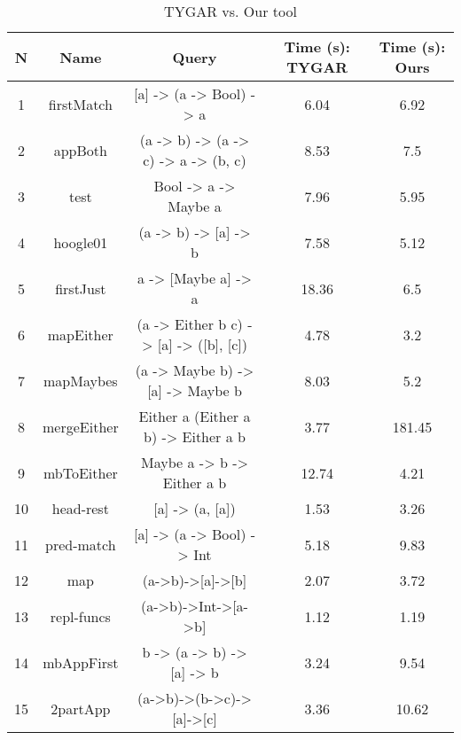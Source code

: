 \documentclass[acmsmall,nonacm]{acmart}
\begin{document}
\begin{table*}
  \tiny
  \caption{TYGAR vs. Our tool }
  \label{tab:results}
  \begin{tabular}{c c c | c | c }
    \toprule
    N & Name & Query   &  Time (s): TYGAR	& Time (s): Ours	\\ %
    \midrule
    1 & firstMatch	&	[a] -> (a -> Bool) -> a	&	6.04&		6.92\\ %
    2 &	appBoth &	(a -> b) -> (a -> c) -> a -> (b, c)	&	8.53	&	7.5\\ %
    3 &	test	&	Bool -> a -> Maybe a	&	7.96&		5.95	\\ %
    4 & hoogle01	&	(a -> b) -> [a] -> b	&	7.58&		5.12	\\ %
    5 &	firstJust	&	a -> [Maybe a] -> a	&	18.36	&	6.5	\\ %
    6 &	mapEither	&	(a -> Either b c) -> [a] -> ([b], [c])&		4.78&		3.2	\\ %
    7 &	mapMaybes	&	(a -> Maybe b) -> [a] -> Maybe b&		8.03&		5.2 \\ %
    8 &	mergeEither	&	Either a (Either a b) -> Either a b	&	3.77&		181.45\\ %
    9 &	mbToEither	&	Maybe a -> b -> Either a b	&	12.74	&	4.21\\ %
    10 & head-rest	&	[a] -> (a, [a])	&	1.53	&	3.26	\\ %
    11 & pred-match	&	[a] -> (a -> Bool) -> Int	&	5.18	&	9.83\\ %
    12 & map	&	(a->b)->[a]->[b]	&	2.07&		3.72\\ %
    13 & repl-funcs	&	(a->b)->Int->[a->b]	&	1.12&		1.19\\ %
    14 & mbAppFirst	&	b -> (a -> b) -> [a] -> b&		3.24&		9.54\\ %
    15 & 2partApp	&	(a->b)->(b->c)->[a]->[c]&		3.36&		10.62\\ %

\end{tabular}
\end{table*}
\end{document}
